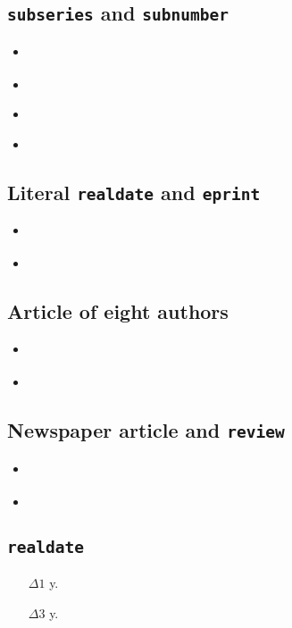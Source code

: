 \documentclass[a4paper,12pt]{scrartcl}
\newcommand*{\Typ}[1]{\texttt{\symbol{64}#1}}
\newcommand*{\Feld}[1]{\texttt{#1}}
\begin{document}
\subsection{\Feld{subseries} and \Feld{subnumber}}
\begin{itemize}
    \item\cite{kossack:et:al:1980}%
    \item{}%
    \item\cite{harck:1980}%
    \item{}%
\end{itemize}

\subsection{Literal \Feld{realdate} and \Feld{eprint}}
\begin{itemize}
    \item\cite{lindauer:oj}%
    \item{}%
\end{itemize}

\subsection{Article of eight authors}
\begin{itemize}
    \item\cite{summerhayes:et:al:1993}%
    \item{}%
\end{itemize}

\subsection{Newspaper article and \Typ{review}}
\begin{itemize}
    \item\cite{stafford:2004}%
    \item{}%
\end{itemize}

\subsection{\Feld{realdate}}
\begin{itemize}
    \item[$\Delta 1$ y.]%
    \item[$\Delta 3$ y.]%
\end{itemize}
\end{document}
